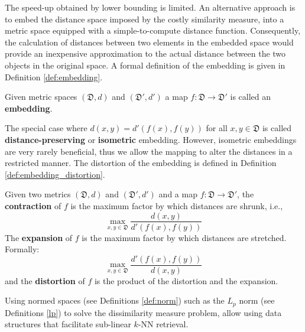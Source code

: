 \iftoggle{edit-mode}{\hspace{0pt}\marginpar{A different approach}}{}
The speed-up obtained by lower bounding is limited. 
An alternative approach is to embed the distance space imposed by the costly similarity measure, into a metric space equipped with a simple-to-compute distance function. 
Consequently, the calculation of distances between two elements in the embedded space would provide an inexpensive approximation to the actual distance between the two objects in the original space. 
A formal definition of the embedding is given in Definition \ref{def:embedding}.

\begin{definition}
Given metric spaces $(\mathfrak{D}, d)$ and $(\mathfrak{D}', d')$ a map $f : \mathfrak{D} \rightarrow \mathfrak{D}'$ is called an \textbf{embedding}.
\label{def:embedding}
\end{definition}

\iftoggle{edit-mode}{\hspace{0pt}\marginpar{Isometric embedding}}{}
The special case where $d(x, y) = d'(f(x), f(y))$ for all $x, y \in \mathfrak{D}$ is called \textbf{distance-preserving} or \textbf{isometric} embedding. However, isometric embeddings are very rarely beneficial, thus we allow the mapping to alter the distances in a restricted manner. The distortion of the embedding is defined in Definition \ref{def:embedding_distortion}.

\begin{definition}
Given two metrics $(\mathfrak{D}, d)$ and $(\mathfrak{D}',d')$ and a map $f : \mathfrak{D} \rightarrow \mathfrak{D}'$, the \textbf{contraction} of $f$ is the maximum factor by which distances are shrunk, i.e.,
\begin{equation}
\max_{x,y \in \mathfrak{D}} \frac{d(x,y)}{d'(f(x),f(y))}
\end{equation}
The \textbf{expansion} of $f$ is the maximum factor by which distances are stretched. Formally:
\begin{equation}
\max_{x,y \in \mathfrak{D}} \frac{d'(f(x),f(y))}{d(x,y)}
\end{equation}
and the \textbf{distortion} of $f$ is the product of the distortion and the expansion.
\label{def:embedding_distortion}
\end{definition}

\iftoggle{edit-mode}{\hspace{0pt}\marginpar{$L_p$ advantage and drawbacks}}{}
Using normed spaces (see Definitions \ref{def:norm}) such as the $L_p$ norm (see Definitions \ref{lp}) to solve the dissimilarity measure problem, allow using data structures that facilitate sub-linear $k$-NN retrieval.

